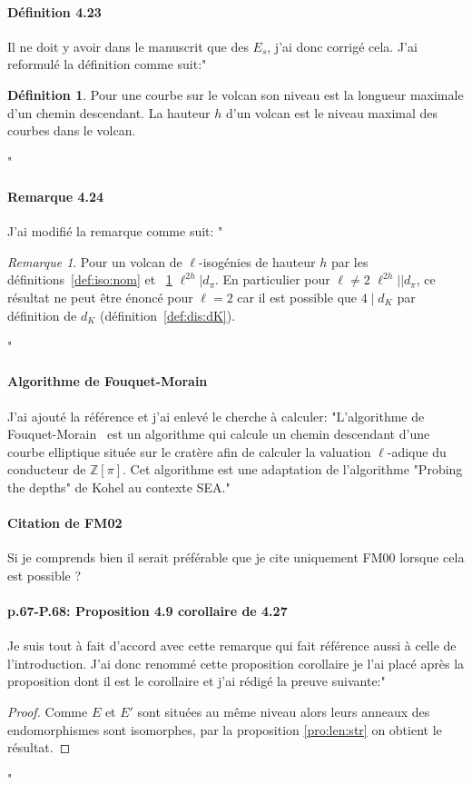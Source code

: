 \documentclass[10pt,a4paper]{article}
\theoremstyle{plain}
\theoremstyle{definition}
\theoremstyle{definition}
\theoremstyle{definition}
\theoremstyle{definition}
\theoremstyle{definition}
\newtheorem{defi}[thm]{Définition}
\theoremstyle{remark}
\newtheorem{rem}[thm]{Remarque}
\theoremstyle{remark}
\theoremstyle{definition}
\begin{document}
\paragraph{Définition 4.23}{Il ne doit y avoir dans le manuscrit que des $E_s$, j'ai donc corrigé cela. J'ai reformulé la définition comme suit:"
\begin{defi}
\label{def:haut:vol}
Pour une courbe sur le volcan son niveau est la longueur maximale d'un chemin descendant.
\newline
La hauteur $h$ d'un volcan est le niveau maximal des courbes dans le volcan.
\end{defi}"}

\paragraph{Remarque 4.24}{J'ai modifié la remarque comme suit:
"\begin{rem} 
\label{rem:lie:dp:dk}
Pour un volcan de $\ell$-isogénies de hauteur $h$ par les 
définitions~\ref{def:iso:nom} et ~\ref{def:haut:vol} $\ell^{2h} | d_{\pi}$.
En particulier pour $\ell \neq 2$ $\ell^{2h}||d_{\pi}$, ce résultat ne peut être 
énoncé  pour $\ell=2$ car il est possible que $4 \mid d_K$ par définition de $d_K$
(définition~\ref{def:dis:dK}).
\end{rem}"}

\paragraph{Algorithme de Fouquet-Morain}{J'ai ajouté la référence et j'ai 
enlevé le cherche à calculer: "L'algorithme de 
Fouquet-Morain~\cite{FouquetMorain02} est un algorithme qui 
calcule un chemin descendant d'une courbe elliptique située sur le cratère afin
de calculer la valuation $\ell$-adique du conducteur de $\mathbb{Z}[\pi]$. Cet
algorithme est une adaptation de l'algorithme "Probing the depths" de Kohel \cite[Section 4.2]{Kohel96} au contexte SEA."}

\paragraph{Citation de FM02}{Si je comprends bien il serait préférable que je cite uniquement FM00 lorsque cela est possible ?}

\paragraph{p.67-P.68: Proposition 4.\color{red}{2}\color{black}9 corollaire de 
4.27}{Je suis tout à fait d'accord avec cette remarque qui fait référence aussi
à celle de l'introduction. J'ai donc renommé cette proposition corollaire je 
l'ai placé après la proposition dont il est le corollaire et j'ai rédigé la 
preuve suivante:"\begin{proof}
Comme $E$ et $E'$ sont situées au même niveau alors leurs anneaux 
des endomorphismes sont isomorphes, par la proposition \ref{pro:len:str} on 
obtient le résultat.
\end{proof}"}
\end{document}
